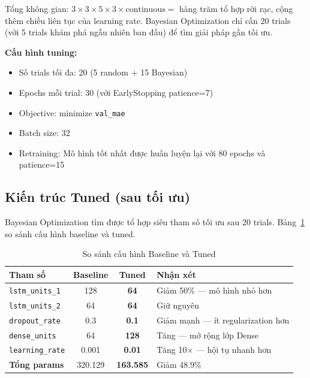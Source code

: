 Tổng không gian: $3 \times 3 \times 5 \times 3 \times \text{continuous} = $ hàng trăm tổ hợp rời rạc, cộng thêm chiều liên tục của learning rate. Bayesian Optimization chỉ cần 20 trials (với 5 trials khám phá ngẫu nhiên ban đầu) để tìm giải pháp gần tối ưu.

\textbf{Cấu hình tuning:}
\begin{itemize}
    \item Số trials tối đa: 20 (5 random + 15 Bayesian)
    \item Epochs mỗi trial: 30 (với EarlyStopping patience=7)
    \item Objective: minimize \texttt{val\_mae}
    \item Batch size: 32
    \item Retraining: Mô hình tốt nhất được huấn luyện lại với 80 epochs và patience=15
\end{itemize}

\subsection{Kiến trúc Tuned (sau tối ưu)}
\label{subsec:tuned_architecture}

Bayesian Optimization tìm được tổ hợp siêu tham số tối ưu sau 20 trials. Bảng~\ref{tab:baseline_vs_tuned} so sánh cấu hình baseline và tuned.

\begin{table}[H]
\centering
\caption{So sánh cấu hình Baseline và Tuned}
\label{tab:baseline_vs_tuned}
\small
\begin{tabular}{|l|c|c|l|}
\hline
\textbf{Tham số} & \textbf{Baseline} & \textbf{Tuned} & \textbf{Nhận xét} \\
\hline
\texttt{lstm\_units\_1}  & 128 & \textbf{64}   & Giảm 50\% — mô hình nhỏ hơn \\
\texttt{lstm\_units\_2}  & 64  & \textbf{64}   & Giữ nguyên \\
\texttt{dropout\_rate}   & 0.3 & \textbf{0.1}  & Giảm mạnh — ít regularization hơn \\
\texttt{dense\_units}    & 64  & \textbf{128}  & Tăng — mở rộng lớp Dense \\
\texttt{learning\_rate}  & 0.001 & \textbf{0.01} & Tăng 10$\times$ — hội tụ nhanh hơn \\
\hline
\textbf{Tổng params}     & 320.129 & \textbf{163.585} & Giảm 48.9\% \\
\hline
\end{tabular}
\end{table}

